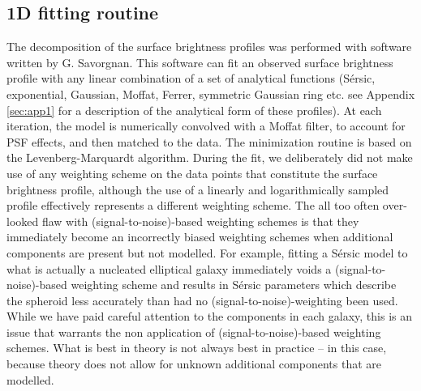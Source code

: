 \documentclass[preprint2]{emulateapj}
\begin{document}
\subsection{1D fitting routine}
The decomposition of the surface brightness profiles was performed with software written by G. Savorgnan.
This software can fit an observed surface brightness profile with any linear combination of 
a set of analytical functions (S\'ersic, exponential, Gaussian, Moffat, Ferrer, symmetric Gaussian ring etc. 
see Appendix \ref{sec:app1} for a description of the analytical form of these profiles).
At each iteration, 
the model is numerically convolved with a Moffat filter, to account for PSF effects, 
and then matched to the data.
The minimization routine is based on the Levenberg-Marquardt algorithm.
During the fit, we deliberately did not make use of any weighting scheme on the data points that constitute the 
surface brightness profile, 
although the use of a linearly and logarithmically sampled profile effectively represents a different weighting scheme.
The all too often over-looked flaw with (signal-to-noise)-based weighting schemes 
is that they immediately become an incorrectly biased weighting schemes when additional components are present but not modelled.
For example, fitting a S\'ersic model to what is actually a nucleated elliptical galaxy immediately voids 
a (signal-to-noise)-based weighting scheme 
and results in S\'ersic parameters which describe the spheroid less accurately than had no (signal-to-noise)-weighting been used.
While we have paid careful attention to the components in each galaxy, 
this is an issue that warrants the non application of (signal-to-noise)-based weighting schemes.
What is best in theory is not always best in practice -- in this case, because theory does not allow for unknown additional components
that are modelled.
\end{document}
